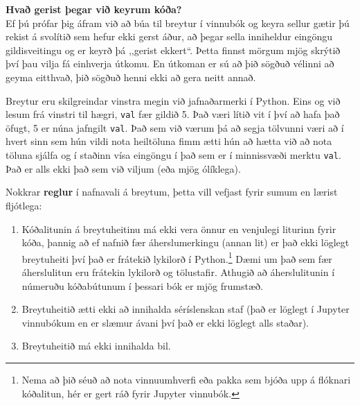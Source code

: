 \begin{itarefni}
\textbf{Hvað gerist þegar við keyrum kóða?}\\
Ef þú prófar þig áfram við að búa til breytur í vinnubók og keyra sellur gætir þú rekist á svolítið sem hefur ekki gerst áður, að þegar sella inniheldur eingöngu gildisveitingu og er keyrð þá ,,gerist ekkert“.
Þetta finnst mörgum mjög skrýtið því þau vilja fá einhverja útkomu.
En útkoman er sú að þið sögðuð vélinni að geyma eitthvað, þið sögðuð henni ekki að gera neitt annað.	
\end{itarefni}

Breytur eru skilgreindar vinstra megin við jafnaðarmerki í Python.
Eins og við lesum frá vinstri til hægri, \texttt{val} fær gildið 5.
Það væri lítið vit í því að hafa það öfugt, 5 er núna jafngilt \texttt{val}.
Það sem við værum þá að segja tölvunni væri að í hvert sinn sem hún vildi nota heiltöluna fimm ætti hún að hætta við að nota töluna sjálfa og í staðinn vísa eingöngu í það sem er í minnissvæði merktu \texttt{val}.
Það er alls ekki það sem við viljum (eða mjög ólíklega).

\vspace{0.1cm}

Nokkrar \textbf{reglur} í nafnavali á breytum, þetta vill vefjast fyrir sumum en lærist fljótlega:
\vspace{0.1cm}
\begin{enumerate}
	\item Kóðalitunin á breytuheitinu má ekki vera önnur en venjulegi liturinn fyrir kóða, þannig að ef nafnið fær áherslumerkingu (annan lit) er það ekki löglegt breytuheiti því það er frátekið lykilorð í Python.\footnote{Nema að þið séuð að nota vinnuumhverfi eða pakka sem bjóða upp á flóknari kóðalitun, hér er gert ráð fyrir Jupyter vinnubók.}
	Dæmi um það sem fær áherslulitun eru frátekin lykilorð og tölustafir.
	Athugið að áherslulitunin í númeruðu kóðabútunum í þessari bók er mjög frumstæð.
	\item Breytuheitið ætti ekki að innihalda séríslenskan staf (það er löglegt í Jupyter vinnubókum en er slæmur ávani því það er ekki löglegt alls staðar).
	\item Breytuheitið má ekki innihalda bil.
\end{enumerate}
\vspace{0.1cm}

